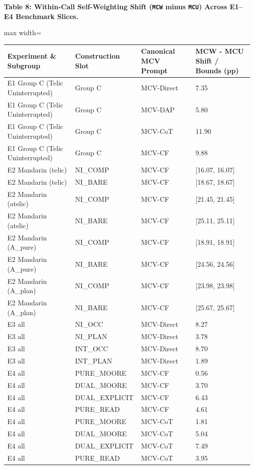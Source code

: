 \documentclass[11pt,a4paper]{article}
\begin{document}
\textbf{Table 8: Within-Call Self-Weighting Shift (\texttt{MCW} minus \texttt{MCU}) Across E1--E4 Benchmark Slices.}

\begin{center}\begingroup\small\setlength{\tabcolsep}{4.5pt}\renewcommand{\arraystretch}{1.12}\begin{adjustbox}{max width=\textwidth}\begin{tabular}{llll}\toprule
\textbf{Experiment \& Subgroup} & \textbf{Construction Slot} & \textbf{Canonical MCV Prompt} & \textbf{MCW - MCU Shift / Bounds (pp)} \\ \midrule
E1 Group C (Telic Uninterrupted) & Group C & MCV-Direct & 7.35 \\
E1 Group C (Telic Uninterrupted) & Group C & MCV-DAP & 5.80 \\
E1 Group C (Telic Uninterrupted) & Group C & MCV-CoT & 11.90 \\
E1 Group C (Telic Uninterrupted) & Group C & MCV-CF & 9.88 \\
E2 Mandarin (telic) & NI\_\allowbreak{}COMP & MCV-CF & [16.07, 16.07] \\
E2 Mandarin (telic) & NI\_\allowbreak{}BARE & MCV-CF & [18.67, 18.67] \\
E2 Mandarin (atelic) & NI\_\allowbreak{}COMP & MCV-CF & [21.45, 21.45] \\
E2 Mandarin (atelic) & NI\_\allowbreak{}BARE & MCV-CF & [25.11, 25.11] \\
E2 Mandarin (A\_\allowbreak{}pure) & NI\_\allowbreak{}COMP & MCV-CF & [18.91, 18.91] \\
E2 Mandarin (A\_\allowbreak{}pure) & NI\_\allowbreak{}BARE & MCV-CF & [24.56, 24.56] \\
E2 Mandarin (A\_\allowbreak{}plan) & NI\_\allowbreak{}COMP & MCV-CF & [23.98, 23.98] \\
E2 Mandarin (A\_\allowbreak{}plan) & NI\_\allowbreak{}BARE & MCV-CF & [25.67, 25.67] \\
E3 all & NI\_\allowbreak{}OCC & MCV-Direct & 8.27 \\
E3 all & NI\_\allowbreak{}PLAN & MCV-Direct & 3.78 \\
E3 all & INT\_\allowbreak{}OCC & MCV-Direct & 8.70 \\
E3 all & INT\_\allowbreak{}PLAN & MCV-Direct & 1.89 \\
E4 all & PURE\_\allowbreak{}MOORE & MCV-CF & 0.56 \\
E4 all & DUAL\_\allowbreak{}MOORE & MCV-CF & 3.70 \\
E4 all & DUAL\_\allowbreak{}EXPLICIT & MCV-CF & 6.43 \\
E4 all & PURE\_\allowbreak{}READ & MCV-CF & 4.61 \\
E4 all & PURE\_\allowbreak{}MOORE & MCV-CoT & 1.81 \\
E4 all & DUAL\_\allowbreak{}MOORE & MCV-CoT & 5.04 \\
E4 all & DUAL\_\allowbreak{}EXPLICIT & MCV-CoT & 7.49 \\
E4 all & PURE\_\allowbreak{}READ & MCV-CoT & 3.95 \\
\bottomrule\end{tabular}\end{adjustbox}\endgroup\end{center}
\end{document}
